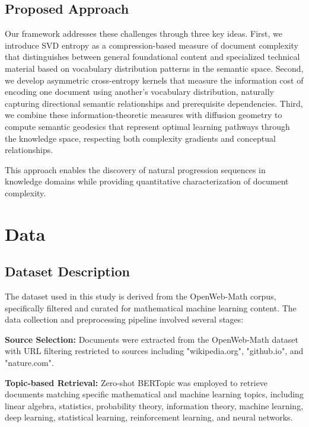 \documentclass[12pt,a4paper]{article}
\begin{document}
\subsection{Proposed Approach}

Our framework addresses these challenges through three key ideas. First, we introduce SVD entropy as a compression-based measure of document complexity that distinguishes between general foundational content and specialized technical material based on vocabulary distribution patterns in the semantic space. Second, we develop asymmetric cross-entropy kernels that measure the information cost of encoding one document using another's vocabulary distribution, naturally capturing directional semantic relationships and prerequisite dependencies. Third, we combine these information-theoretic measures with diffusion geometry to compute semantic geodesics that represent optimal learning pathways through the knowledge space, respecting both complexity gradients and conceptual relationships.

This approach enables the discovery of natural progression sequences in knowledge domains while providing quantitative characterization of document complexity.

\section{Data}

\subsection{Dataset Description}

The dataset used in this study is derived from the OpenWeb-Math \cite{grosset2021openwebmath} corpus, specifically filtered and curated for mathematical machine learning content. The data collection and preprocessing pipeline involved several stages:

\textbf{Source Selection:} Documents were extracted from the OpenWeb-Math dataset with URL filtering restricted to sources including "wikipedia.org", "github.io", and "nature.com".

\textbf{Topic-based Retrieval:} Zero-shot BERTopic \cite{grootendorst2022bertopic} was employed to retrieve documents matching specific mathematical and machine learning topics, including linear algebra, statistics, probability theory, information theory, machine learning, deep learning, statistical learning, reinforcement learning, and neural networks.
\end{document}
